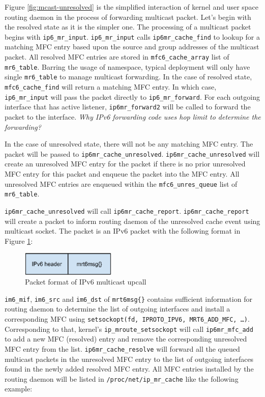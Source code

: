 \documentclass{article}
\begin{document}
Figure \ref{fig:mcast-unresolved} is the simplified interaction of kernel and
user space routing daemon in the process of forwarding multicast packet. Let's
begin with the resolved state as it is the simpler one. The processing of a
multicast packet begins with \texttt{ip6\_mr\_input}. \texttt{ip6\_mr\_input}
calls \texttt{ip6mr\_cache\_find} to lookup for a matching MFC entry based upon
the source and group addresses of the multicast packet. All resolved MFC entries
are stored in \texttt{mfc6\_cache\_array} list of \texttt{mr6\_table}.  Barring
the usage of namespace, typical deployment will only have single
\texttt{mr6\_table} to manage multicast forwarding. In the case of resolved
state, \texttt{mfc6\_cache\_find} will return a matching MFC entry. In which
case, \texttt{ip6\_mr\_input} will pass the packet directly to
\texttt{ip6\_mr\_forward}. For each outgoing interface that has active listener,
\texttt{ip6mr\_forward2} will be called to forward the packet to the interface.
\textit{Why IPv6 forwarding code uses hop limit to determine the forwarding?}

In the case of unresolved state, there will not be any matching MFC entry. The
packet will be passed to \texttt{ip6mr\_cache\_unresolved}.
\texttt{ip6mr\_cache\_unresolved} will create an unresolved MFC entry for the
packet if there is no prior unresolved MFC entry for this packet and enqueue the
packet into the MFC entry. All unresolved MFC entries are enqueued within the
\texttt{mfc6\_unres\_queue} list of \texttt{mr6\_table}.


\texttt{ip6mr\_cache\_unresolved} will call \texttt{ip6mr\_cache\_report}.
\texttt{ip6mr\_cache\_report} will create a packet to inform routing daemon of
the unresolved cache event using multicast socket. The packet is an IPv6 packet
with the following format in Figure \ref{fig:mcast-upcall}:

\begin{figure}[h]
  \begin{center}
    \includegraphics[width=0.4\textwidth]{mcast-upcall}
    \caption{Packet format of IPv6 multicast upcall}
    \label{fig:mcast-upcall}
  \end{center}
\end{figure}

\texttt{im6\_mif}, \texttt{im6\_src} and \texttt{im6\_dst} of
\texttt{mrt6msg\{\}} contains sufficient information for routing daemon to
determine the list of outgoing interfaces and install a corresponding MFC using
\texttt{setsockopt(fd, IPROTO\_IPV6, MRT6\_ADD\_MFC, \ldots)}. Corresponding to
that, kernel's \texttt{ip\_mroute\_setsockopt} will call
\texttt{ip6mr\_mfc\_add} to add a new MFC (resolved) entry and remove the
corresponding unresolved MFC entry from the list. \texttt{ip6mr\_cache\_resolve}
will forward all the queued multicast packets in the unresolved MFC entry to the
list of outgoing interfaces found in the newly added resolved MFC entry. All MFC
entries installed by the routing daemon will be listed in
\texttt{/proc/net/ip\_mr\_cache} like the following example:
\end{document}
